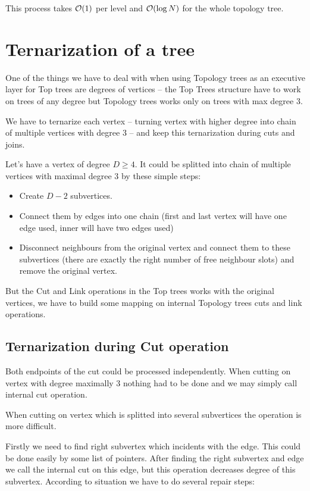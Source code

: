 This process takes ${\cal O}(1)$ per level and ${\cal O}(\log N)$ for the whole topology tree.


\section{Ternarization of a tree}

One of the things we have to deal with when using Topology trees as an executive
layer for Top trees are degrees of vertices -- the Top Trees structure have to
work on trees of any degree but Topology trees works only on trees with max
degree 3.

We have to {\I ternarize} each vertex -- turning vertex with higher degree into
chain of multiple vertices with degree 3 -- and keep this ternarization during
cuts and joins.

Let's have a vertex of degree $D\ge4$. It could be splitted into chain of
multiple vertices with maximal degree 3 by these simple steps:
\begin{itemize}
\item Create $D - 2$ subvertices.
\item Connect them by edges into one chain (first and last vertex will have one
edge used, inner will have two edges used)
\item Disconnect neighbours from the original vertex and connect them to these
subvertices (there are exactly the right number of free neighbour slots) and
remove the original vertex.
\end{itemize}

But the Cut and Link operations in the Top trees works with the original
vertices, we have to build some mapping on internal Topology trees cuts and link
operations.

\subsection{Ternarization during Cut operation}

Both endpoints of the cut could be processed independently. When cutting on
vertex with degree maximally 3 nothing had to be done and we may simply call
internal cut operation.

When cutting on vertex which is splitted into several subvertices the operation
is more difficult.

Firstly we need to find right subvertex which incidents with the edge. This
could be done easily by some list of pointers. After finding the right subvertex
and edge we call the internal cut on this edge, but this operation decreases
degree of this subvertex. According to situation we have to do several repair
steps:

